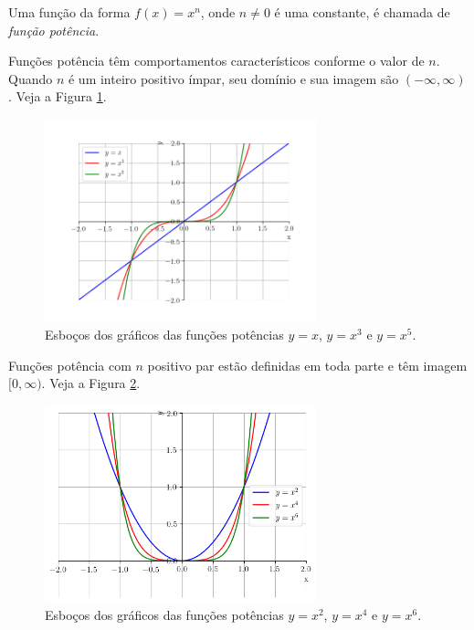 Uma função da forma $f(x)=x^n$, onde $n\neq 0$ é uma constante, é chamada de \emph{função potência}.

Funções potência têm comportamentos característicos conforme o valor de $n$. Quando $n$ é um inteiro positivo ímpar, seu domínio e sua imagem são $(-\infty, \infty)$. Veja a Figura \ref{fig:funpot_impar}.

\begin{figure}[H]
  \centering
  \includegraphics[width=0.7\textwidth]{./cap_funcao/dados/fig_funpot_impar/fig_funpot_impar}
  \caption{Esboços dos gráficos das funções potências $y=x$, $y=x^3$ e $y=x^5$.}
  \label{fig:funpot_impar}
\end{figure}

Funções potência com $n$ positivo par estão definidas em toda parte e têm imagem $[0, \infty)$. Veja a Figura \ref{fig:funpot_par}.

\begin{figure}[H]
  \centering
  \includegraphics[width=0.7\textwidth]{./cap_funcao/dados/fig_funpot_par/fig_funpot_par}
  \caption{Esboços dos gráficos das funções potências $y=x^2$, $y=x^4$ e $y=x^6$.}
  \label{fig:funpot_par}
\end{figure}

